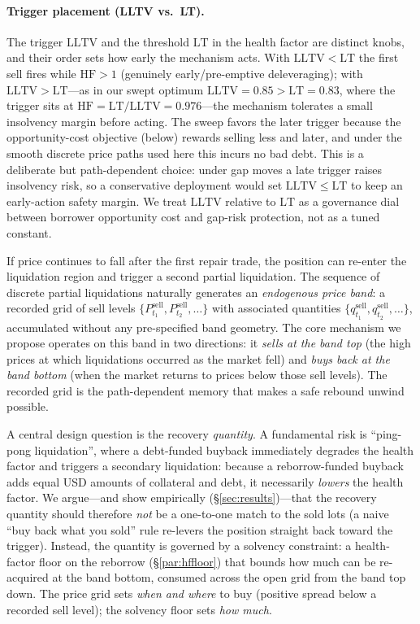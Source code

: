\documentclass[12pt]{article}
\begin{document}
\paragraph{Trigger placement (LLTV vs.\ LT).} The trigger $\mathrm{LLTV}$ and the threshold $\mathrm{LT}$ in the health factor are distinct knobs, and their order sets how early the mechanism acts. With $\mathrm{LLTV}<\mathrm{LT}$ the first sell fires while $\mathrm{HF}>1$ (genuinely early/pre-emptive deleveraging); with $\mathrm{LLTV}>\mathrm{LT}$---as in our swept optimum $\mathrm{LLTV}=0.85>\mathrm{LT}=0.83$, where the trigger sits at $\mathrm{HF}=\mathrm{LT}/\mathrm{LLTV}=0.976$---the mechanism tolerates a small insolvency margin before acting. The sweep favors the later trigger because the opportunity-cost objective (below) rewards selling less and later, and under the smooth discrete price paths used here this incurs no bad debt. This is a deliberate but path-dependent choice: under gap moves a late trigger raises insolvency risk, so a conservative deployment would set $\mathrm{LLTV}\le\mathrm{LT}$ to keep an early-action safety margin. We treat $\mathrm{LLTV}$ relative to $\mathrm{LT}$ as a governance dial between borrower opportunity cost and gap-risk protection, not as a tuned constant.

If price continues to fall after the first repair trade, the position can re-enter the liquidation region and trigger a second partial liquidation. The sequence of discrete partial liquidations naturally generates an \emph{endogenous price band}: a recorded grid of sell levels $\{P_{t_1}^{\text{sell}},P_{t_2}^{\text{sell}},\dots\}$ with associated quantities $\{q_{t_1}^{\text{sell}},q_{t_2}^{\text{sell}},\dots\}$, accumulated without any pre-specified band geometry. The core mechanism we propose operates on this band in two directions: it \emph{sells at the band top} (the high prices at which liquidations occurred as the market fell) and \emph{buys back at the band bottom} (when the market returns to prices below those sell levels). The recorded grid is the path-dependent memory that makes a safe rebound unwind possible.

A central design question is the recovery \emph{quantity}. A fundamental risk is ``ping-pong liquidation'', where a debt-funded buyback immediately degrades the health factor and triggers a secondary liquidation: because a reborrow-funded buyback adds equal USD amounts of collateral and debt, it necessarily \emph{lowers} the health factor. We argue---and show empirically (\S\ref{sec:results})---that the recovery quantity should therefore \emph{not} be a one-to-one match to the sold lots (a naive ``buy back what you sold'' rule re-levers the position straight back toward the trigger). Instead, the quantity is governed by a solvency constraint: a health-factor floor on the reborrow (\S\ref{par:hffloor}) that bounds how much can be re-acquired at the band bottom, consumed across the open grid from the band top down. The price grid sets \emph{when and where} to buy (positive spread below a recorded sell level); the solvency floor sets \emph{how much}.
\end{document}
